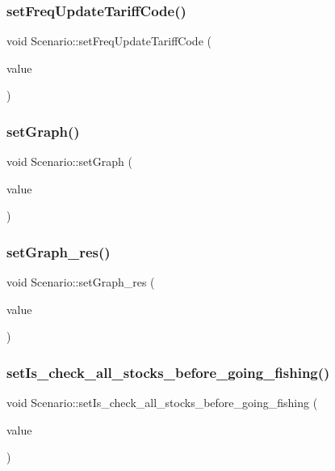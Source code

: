 \subsubsection{\texorpdfstring{setFreqUpdateTariffCode()}{setFreqUpdateTariffCode()}}
{\footnotesize\ttfamily void Scenario\+::set\+Freq\+Update\+Tariff\+Code (\begin{DoxyParamCaption}\item[{int}]{value }\end{DoxyParamCaption})}

\mbox{\label{class_scenario_a003bf6a0de1125e13ab878708a989eb4}} 
\subsubsection{\texorpdfstring{setGraph()}{setGraph()}}
{\footnotesize\ttfamily void Scenario\+::set\+Graph (\begin{DoxyParamCaption}\item[{int}]{value }\end{DoxyParamCaption})}

\mbox{\label{class_scenario_a056129b9812ee7817847fb987e3e0205}} 
\subsubsection{\texorpdfstring{setGraph\_res()}{setGraph\_res()}}
{\footnotesize\ttfamily void Scenario\+::set\+Graph\+\_\+res (\begin{DoxyParamCaption}\item[{const Q\+String\+List \&}]{value }\end{DoxyParamCaption})}

\mbox{\label{class_scenario_a93b19cdb80507664708a0902db15805c}} 
\subsubsection{\texorpdfstring{setIs\_check\_all\_stocks\_before\_going\_fishing()}{setIs\_check\_all\_stocks\_before\_going\_fishing()}}
{\footnotesize\ttfamily void Scenario\+::set\+Is\+\_\+check\+\_\+all\+\_\+stocks\+\_\+before\+\_\+going\+\_\+fishing (\begin{DoxyParamCaption}\item[{bool}]{value }\end{DoxyParamCaption})}

